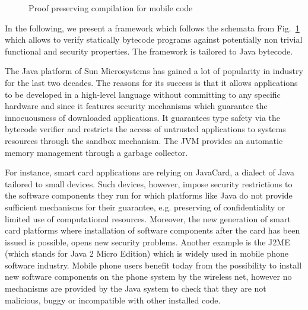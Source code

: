  

    \begin{figure}[ht!]
\begin{center}
\caption{\sc Proof preserving compilation for mobile code}
\label{intro:PPO}
\end{center}
\end{figure}


In the following, we present a framework which follows the schemata from Fig.\ \ref{intro:PPO}  which allows to verify statically bytecode programs 
against potentially non trivial functional and security properties. The framework is tailored to Java bytecode.

  The Java platform  of Sun Microsystems has gained a lot of popularity in industry   for the last two decades.
 The reasons for its  success is that it allows applications to 
 be developed in a high-level language without committing to any
 specific hardware and since it features security mechanisms which
 guarantee the innocuousness of downloaded applications. It guarantees type safety 
 via the bytecode verifier and   restricts the access  of untrusted applications to systems resources through the sandbox mechanism.
 The JVM provides an automatic memory management through a garbage collector.  

 For instance, smart card applications are relying  on JavaCard, a dialect of Java tailored to small devices.
 Such devices, however, impose  security restrictions  to the software components  they run for which platforms like Java do not provide 
 sufficient mechanisms for their guarantee, e.g. preserving of confidentiality or limited use of computational resources. Moreover,
 the new generation of smart card platforms where installation of  software components after the card has been issued is possible, opens new security problems.
 Another example is the J2ME (which stands for Java 2 Micro Edition) which is widely used in mobile phone software industry.
 Mobile phone users benefit today from the possibility to install new software components on the phone system by the wireless net, 
 however no mechanisms are provided by the Java system to check that they are not malicious, buggy or incompatible with other installed
code.


